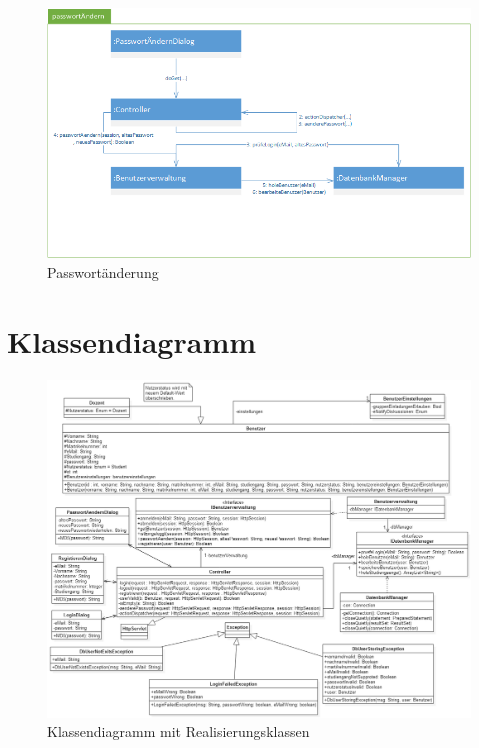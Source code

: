\documentclass[12pt]{scrreprt}
\begin{document}
\begin{figure}[h]
	\centering
	\includegraphics[width=\linewidth]{Bilder/Kommunikationsdiagramme/passwortAendern}
	\caption{Passwortänderung}
	\label{Passwortaenderung}
\end{figure}

\section{Klassendiagramm}
\begin{figure}[!h]
	\centering
	\includegraphics[width=\textwidth]{Bilder/Klassendiagramm/RealisierungsklassenKlassen.png}
	\caption{Klassendiagramm mit Realisierungsklassen}
	\label{fig:Klassendiagramm}
\end{figure}
\end{document}
